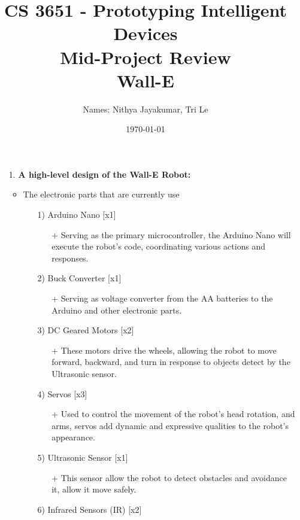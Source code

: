 \documentclass[12pt]{article}
\title{CS 3651 - Prototyping Intelligent Devices\\ Mid-Project Review \\Wall-E}
\author{Names: Nithya Jayakumar, Tri Le}
\date{\today}
\begin{document}
\maketitle

\newpage
\begin{itemize}
    \item[1.] \textbf{A high-level design of the Wall-E Robot:}
    \begin{itemize}
        \item The electronic parts that are currently use
        \begin{itemize}
            \item[1)] Arduino Nano [x1]
            \begin{itemize}
                \item[+] Serving as the primary microcontroller, the Arduino Nano will execute the robot’s code, coordinating various actions and responses.
            \end{itemize}
            \item[2)] Buck Converter [x1]
            \begin{itemize}
                \item[+] Serving as voltage converter from the AA batteries to the Arduino and other electronic parts.
            \end{itemize}
            \item[3)] DC Geared Motors [x2]
            \begin{itemize}
                \item[+] These motors drive the wheels, allowing the robot to move forward, backward, and turn in response to objects detect by the Ultrasonic sensor.
            \end{itemize}
            \item[4)] Servos [x3]
            \begin{itemize}
                \item[+] Used to control the movement of the robot’s head rotation, and arms, servos add dynamic and expressive qualities to the robot’s appearance.
            \end{itemize}
            \item[5)] Ultrasonic Sensor [x1]
            \begin{itemize}
                \item[+] This sensor allow the robot to detect obstacles and avoidance it, allow it move safely.
            \end{itemize}
            \item[6)] Infrared Sensors (IR) [x2]

\end{itemize}
\end{itemize}
\end{itemize}
\end{document}
